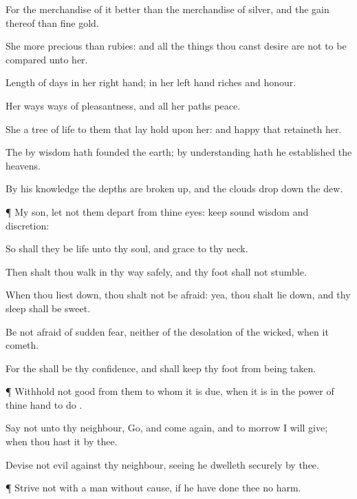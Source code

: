 {For the
merchandise of it
{}
better than the
merchandise of
silver, and the
gain thereof than fine
gold.

She
{} more
precious than
rubies: and all the things thou canst
desire are not to be
compared unto her.

Length of
days
{} in her right
hand;
{} in her left
hand
riches and
honour.

Her
ways
{}
ways of
pleasantness, and all her
paths
{}
peace.

She
{} a
tree of
life to them that lay
hold upon her: and
happy
{} that
retaineth her.

The
{} by
wisdom hath
founded the
earth; by
understanding hath he
established the
heavens.

By his
knowledge the
depths are broken
up, and the
clouds drop
down the
dew.


\par }{\PP {}¶ My
son, let not them
depart from thine
eyes:
keep sound
wisdom and
discretion:

So shall they be
life unto thy
soul, and
grace to thy
neck.

Then shalt thou
walk in thy
way
safely, and thy
foot shall not
stumble.

When thou liest
down, thou shalt not be
afraid: yea, thou shalt lie
down, and thy
sleep shall be
sweet.

Be not
afraid of
sudden
fear, neither of the
desolation of the
wicked, when it
cometh.

For the
{} shall be thy
confidence, and shall
keep thy
foot from being
taken.


\par }{\PP {}¶
Withhold not
good from them to whom it is
due, when it is in the
power of thine
hand to
do
{}.

Say not unto thy
neighbour,
Go, and come
again, and to
morrow I will
give; when thou
hast it by thee.

Devise not
evil against thy
neighbour, seeing he
dwelleth
securely by thee.


\par }{\PP {}¶
Strive not with a
man without
cause, if he have
done thee no
harm.


}
